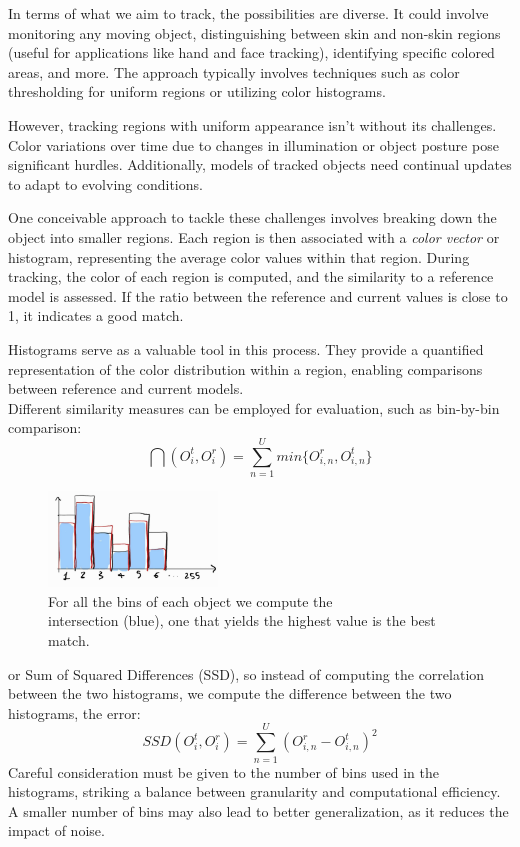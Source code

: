 In terms of what we aim to track, the possibilities are diverse. 
It could involve monitoring any moving object, distinguishing between skin and non-skin regions (useful for applications like hand and face tracking), identifying specific colored areas, and more. 
The approach typically involves techniques such as color thresholding for uniform regions or utilizing color histograms. 

However, tracking regions with uniform appearance isn't without its challenges. 
Color variations over time due to changes in illumination or object posture pose significant hurdles. 
Additionally, models of tracked objects need continual updates to adapt to evolving conditions.

One conceivable approach to tackle these challenges involves breaking down the object into smaller regions. 
Each region is then associated with a \textit{color vector} or histogram, representing the average color values within that region. 
During tracking, the color of each region is computed, and the similarity to a reference model is assessed. 
If the ratio between the reference and current values is close to 1, it indicates a good match.

Histograms serve as a valuable tool in this process. 
They provide a quantified representation of the color distribution within a region, enabling comparisons between reference and current models. 
\\Different similarity measures can be employed for evaluation, such as bin-by-bin comparison: 
\[
    \bigcap (O_i^t, O_i^r) = \sum_{n=1}^{U} min \{O_{i,n}^r, O_{i,n}^t\} 
\]

\begin{figure}[H]
    \centering
    \includegraphics[width=0.4\textwidth]{Figures/bins.jpg}
    \caption{For all the bins of each object we compute the \\intersection (blue), one that
    yields the highest value is the best match.}
    \label{fig:bins}
\end{figure}

or Sum of Squared Differences (SSD), so instead of computing the correlation between the two histograms, we compute the difference between the two histograms, the error: 
\[ 
    SSD(O_i^t, O_i^r) = \sum_{n=1}^{U} (O_{i,n}^r - O_{i,n}^t)^2 
\]
Careful consideration must be given to the number of bins used in the histograms, striking a balance between granularity and computational efficiency. A smaller number of bins may also lead to better generalization, as it reduces the impact of noise.

